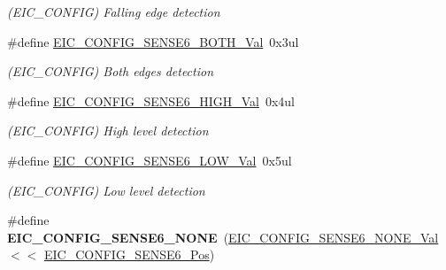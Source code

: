 \begin{DoxyCompactItemize}
\begin{DoxyCompactList}\small\item\em (E\+I\+C\+\_\+\+C\+O\+N\+F\+I\+G) Falling edge detection \end{DoxyCompactList}\item 
\hypertarget{group___s_a_m_l21___e_i_c_ga30183c55bdd242f2e73f8e9510c3208a}{}\#define \hyperlink{group___s_a_m_l21___e_i_c_ga30183c55bdd242f2e73f8e9510c3208a}{E\+I\+C\+\_\+\+C\+O\+N\+F\+I\+G\+\_\+\+S\+E\+N\+S\+E6\+\_\+\+B\+O\+T\+H\+\_\+\+Val}~0x3ul\label{group___s_a_m_l21___e_i_c_ga30183c55bdd242f2e73f8e9510c3208a}

\begin{DoxyCompactList}\small\item\em (E\+I\+C\+\_\+\+C\+O\+N\+F\+I\+G) Both edges detection \end{DoxyCompactList}\item 
\hypertarget{group___s_a_m_l21___e_i_c_ga308809e49e6d8ddd024e96f22f1cf72c}{}\#define \hyperlink{group___s_a_m_l21___e_i_c_ga308809e49e6d8ddd024e96f22f1cf72c}{E\+I\+C\+\_\+\+C\+O\+N\+F\+I\+G\+\_\+\+S\+E\+N\+S\+E6\+\_\+\+H\+I\+G\+H\+\_\+\+Val}~0x4ul\label{group___s_a_m_l21___e_i_c_ga308809e49e6d8ddd024e96f22f1cf72c}

\begin{DoxyCompactList}\small\item\em (E\+I\+C\+\_\+\+C\+O\+N\+F\+I\+G) High level detection \end{DoxyCompactList}\item 
\hypertarget{group___s_a_m_l21___e_i_c_ga3df3d29ae144b0c1d5b95a4f898fb78d}{}\#define \hyperlink{group___s_a_m_l21___e_i_c_ga3df3d29ae144b0c1d5b95a4f898fb78d}{E\+I\+C\+\_\+\+C\+O\+N\+F\+I\+G\+\_\+\+S\+E\+N\+S\+E6\+\_\+\+L\+O\+W\+\_\+\+Val}~0x5ul\label{group___s_a_m_l21___e_i_c_ga3df3d29ae144b0c1d5b95a4f898fb78d}

\begin{DoxyCompactList}\small\item\em (E\+I\+C\+\_\+\+C\+O\+N\+F\+I\+G) Low level detection \end{DoxyCompactList}\item 
\hypertarget{group___s_a_m_l21___e_i_c_ga7631d16699c592b20e9b8b0edadd0368}{}\#define {\bfseries E\+I\+C\+\_\+\+C\+O\+N\+F\+I\+G\+\_\+\+S\+E\+N\+S\+E6\+\_\+\+N\+O\+N\+E}~(\hyperlink{group___s_a_m_l21___e_i_c_ga9c966fa77b4176c92e747e52084cfbd8}{E\+I\+C\+\_\+\+C\+O\+N\+F\+I\+G\+\_\+\+S\+E\+N\+S\+E6\+\_\+\+N\+O\+N\+E\+\_\+\+Val}    $<$$<$ \hyperlink{group___s_a_m_l21___e_i_c_ga17d194da98be0777ff750650293d386d}{E\+I\+C\+\_\+\+C\+O\+N\+F\+I\+G\+\_\+\+S\+E\+N\+S\+E6\+\_\+\+Pos})\label{group___s_a_m_l21___e_i_c_ga7631d16699c592b20e9b8b0edadd0368}


\end{DoxyCompactItemize}
